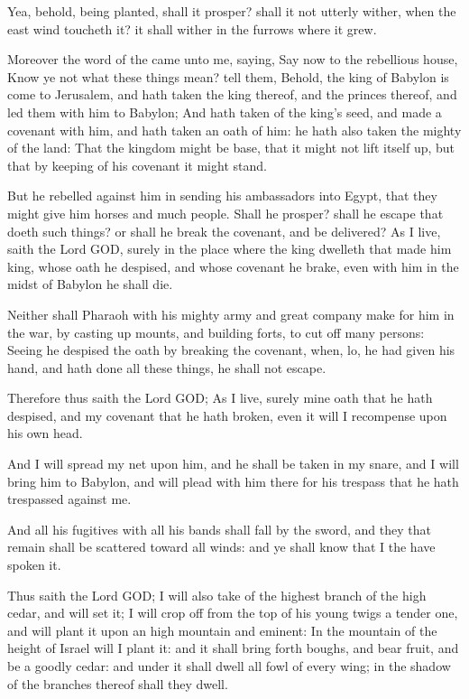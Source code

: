 \verse Yea, behold, being planted, shall it prosper? shall it not utterly wither, when the east wind toucheth it? it shall wither in the furrows where it grew.

\verse Moreover the word of the \LORD came unto me, saying, \verse Say now to the rebellious house, Know ye not what these things mean?  tell them, Behold, the king of Babylon is come to Jerusalem, and hath taken the king thereof, and the princes thereof, and led them with him to Babylon; \verse And hath taken of the king's seed, and made a covenant with him, and hath taken an oath of him: he hath also taken the mighty of the land: \verse That the kingdom might be base, that it might not lift itself up, but that by keeping of his covenant it might stand.

\verse But he rebelled against him in sending his ambassadors into Egypt, that they might give him horses and much people. Shall he prosper? shall he escape that doeth such things? or shall he break the covenant, and be delivered?  \verse As I live, saith the Lord GOD, surely in the place where the king dwelleth that made him king, whose oath he despised, and whose covenant he brake, even with him in the midst of Babylon he shall die.

\verse Neither shall Pharaoh with his mighty army and great company make for him in the war, by casting up mounts, and building forts, to cut off many persons: \verse Seeing he despised the oath by breaking the covenant, when, lo, he had given his hand, and hath done all these things, he shall not escape.

\verse Therefore thus saith the Lord GOD; As I live, surely mine oath that he hath despised, and my covenant that he hath broken, even it will I recompense upon his own head.

\verse And I will spread my net upon him, and he shall be taken in my snare, and I will bring him to Babylon, and will plead with him there for his trespass that he hath trespassed against me.

\verse And all his fugitives with all his bands shall fall by the sword, and they that remain shall be scattered toward all winds: and ye shall know that I the \LORD have spoken it.

\verse Thus saith the Lord GOD; I will also take of the highest branch of the high cedar, and will set it; I will crop off from the top of his young twigs a tender one, and will plant it upon an high mountain and eminent: \verse In the mountain of the height of Israel will I plant it: and it shall bring forth boughs, and bear fruit, and be a goodly cedar: and under it shall dwell all fowl of every wing; in the shadow of the branches thereof shall they dwell.

